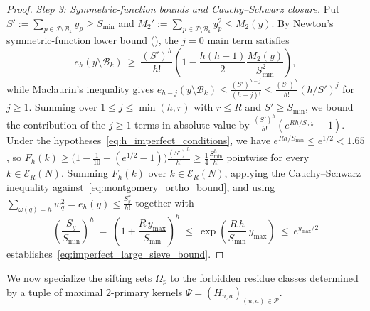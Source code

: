 \documentclass[11pt, a4paper]{article}
\theoremstyle{plain}
\theoremstyle{definition}
\begin{document}
\begin{proof}
\medskip\noindent\emph{Step 3: Symmetric-function bounds and Cauchy--Schwarz closure.}
Put $S':=\sum_{p\in\mathcal{I}\setminus\mathcal{B}_k}y_p\ge S_{\min}$ and $M_2':=\sum_{p\in\mathcal{I}\setminus\mathcal{B}_k}y_p^{2}\le M_2(y)$. By Newton's symmetric-function lower bound (\cite[Lemma~4.25]{dahan2026a}), the $j=0$ main term satisfies
$$e_h(y\setminus\mathcal{B}_k)\ \ge\ \frac{(S')^{h}}{h!}\left(1-\frac{h(h-1)}{2}\frac{M_2(y)}{S_{\min}^{2}}\right),$$
while Maclaurin's inequality gives $e_{h-j}(y\setminus\mathcal{B}_k)\le\frac{(S')^{h-j}}{(h-j)!}\le\frac{(S')^{h}}{h!}(h/S')^{j}$ for $j\ge1$. Summing over $1\le j\le\min(h,r)$ with $r\le R$ and $S'\ge S_{\min}$, we bound the contribution of the $j\ge1$ terms in absolute value by $\frac{(S')^{h}}{h!}(e^{Rh/S_{\min}}-1)$. Under the hypotheses~\eqref{eq:h_imperfect_conditions}, we have $e^{Rh/S_{\min}}\le e^{1/2}<1.65$, so $F_h(k)\ge\big(1-\frac{1}{10}-(e^{1/2}-1)\big)\frac{(S')^h}{h!}\ge\frac14\frac{S_{\min}^{h}}{h!}$ pointwise for every $k\in\mathcal{E}_R(N)$. Summing $F_h(k)$ over $k\in\mathcal{E}_R(N)$, applying the Cauchy--Schwarz inequality against~\eqref{eq:montgomery_ortho_bound}, and using $\sum_{\omega(q)=h}w_q^2 = e_h(y)\le\frac{S_y^{h}}{h!}$ together with
$$\left(\frac{S_y}{S_{\min}}\right)^{h}\ =\ \left(1+\frac{R\,y_{\max}}{S_{\min}}\right)^{h}\ \le\ \exp\!\left(\frac{R\,h}{S_{\min}}\,y_{\max}\right)\ \le\ e^{y_{\max}/2}$$
establishes~\eqref{eq:imperfect_large_sieve_bound}.
\end{proof}

We now specialize the sifting sets $\Omega_p$ to the forbidden residue classes determined by a tuple of maximal $2$-primary kernels $\Psi=(H_{u,a})_{(u,a)\in\mathcal{P}}$.
\end{document}
